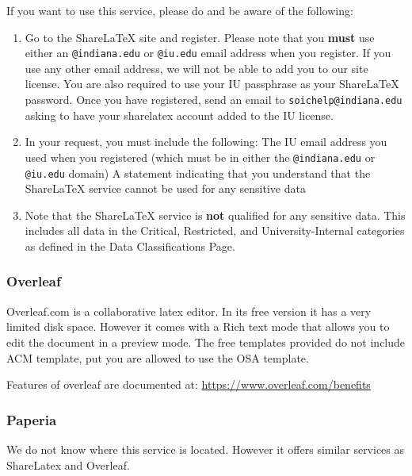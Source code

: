 If you want to use this service, please do and be aware of the following: 

\begin{enumerate}

\item Go to the ShareLaTeX site and register.  Please note that you
  {\bf must} use either an \verb|@indiana.edu| or \verb|@iu.edu| email
  address when you register. If you use any other email address, we
  will not be able to add you to our site license.  You are also
  required to use your IU passphrase as your ShareLaTeX password.
  Once you have registered, send an email to
  \verb|soichelp@indiana.edu| asking to have your sharelatex account 
  added to the IU license.  

\item
  In your request, you must include the following: The IU email
  address you used when you registered (which must be in either the
  \verb|@indiana.edu| or \verb|@iu.edu| domain) A statement indicating
  that you understand that the ShareLaTeX service cannot be used for
  any sensitive data

\item Note that the ShareLaTeX service is {\bf not} qualified for any
  sensitive data. This includes all data in the Critical, Restricted,
  and University-Internal categories as defined in the Data
  Classifications Page.

\end{enumerate}


\subsubsection{Overleaf}\label{overleaf}

Overleaf.com is a collaborative latex editor. In its free version it has
a very limited disk space. However it comes with a Rich text mode that
allows you to edit the document in a preview mode. The free templates
provided do not include ACM template, put you are allowed to use the OSA
template.

Features of overleaf are documented at:
\url{https://www.overleaf.com/benefits}

\subsubsection{Paperia}\label{paperia}

We do not know where this service is located. However it offers similar
services as ShareLatex and Overleaf.

